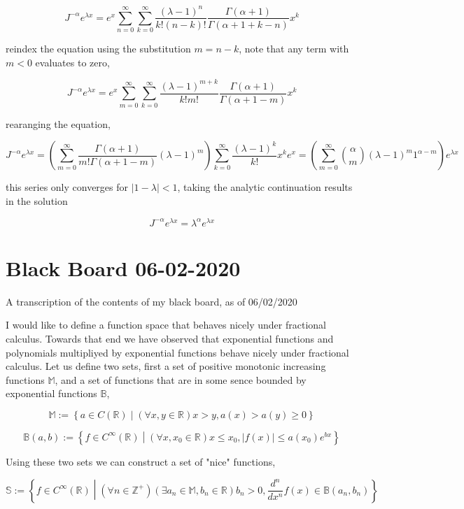 \documentclass[%
 preprint,
 amsmath, amssymb, aps, pra, 10pt
]{revtex4-2}
\begin{document}
\[J^{-\alpha} e^{\lambda x} = e^x \sum_{n=0}^\infty \sum_{k=0}^\infty \frac{(\lambda - 1)^n}{k!(n - k)!}\frac{\Gamma(\alpha + 1)}{\Gamma(\alpha + 1 + k - n)}x^k \]

reindex the equation using the substitution $m = n - k$, note that any term with $m < 0$ evaluates to zero,

\[J^{-\alpha} e^{\lambda x} = e^x \sum_{m=0}^\infty \sum_{k=0}^\infty \frac{(\lambda - 1)^{m + k}}{k!m!}\frac{\Gamma(\alpha + 1)}{\Gamma(\alpha + 1 - m)}x^k \]

rearanging the equation,

\[J^{-\alpha} e^{\lambda x} = \left(\sum_{m=0}^\infty \frac{\Gamma(\alpha + 1)}{m!\Gamma(\alpha + 1 - m)}(\lambda - 1)^m\right) \sum_{k=0}^\infty \frac{(\lambda - 1)^k}{k!}x^k e^x = \left(\sum_{m=0}^\infty \binom{\alpha}{m}(\lambda - 1)^m 1^{\alpha - m}\right) e^{\lambda x}\]

this series only converges for $\left|1 - \lambda\right| < 1$, taking the analytic continuation results in the solution

 \[J^{-\alpha} e^{\lambda x} = \lambda^\alpha e^{\lambda x}\]
 
 
\section{Black Board 06-02-2020}

A transcription of the contents of my black board, as of 06/02/2020

I would like to define a function space that behaves nicely under fractional calculus. Towards that end we have observed that exponential functions and polynomials multipliyed by exponential functions behave nicely under fractional calculus. Let us define two sets, first a set of positive monotonic increasing functions $\mathbb{M}$, and a set of functions that are in some sence bounded by exponential functions $\mathbb{B}$,

\[\mathbb{M} := \left\lbrace a \in C(\mathbb{R}) \middle| (\forall x, y \in \mathbb{R}) x > y, a(x) > a(y) \geq 0 \right\rbrace\]

\[\mathbb{B}(a, b) := \left\lbrace f \in C^\infty(\mathbb{R}) \middle| (\forall x, x_0 \in \mathbb{R}) x \leq x_0, |f(x)| \leq a(x_0)e^{bx} \right\rbrace\]

Using these two sets we can construct a set of "nice" functions,

\begin{equation}
\mathbb{S} := \left\lbrace f \in C^\infty(\mathbb{R}) \middle| (\forall n \in \mathbb{Z}^+)(\exists a_n \in \mathbb{M}, b_n \in \mathbb{R}) b_n > 0, \frac{d^n}{dx^n}f(x) \in \mathbb{B}(a_n, b_n) \right\rbrace
\label{exponentialy_bounded}
\end{equation}
\end{document}
